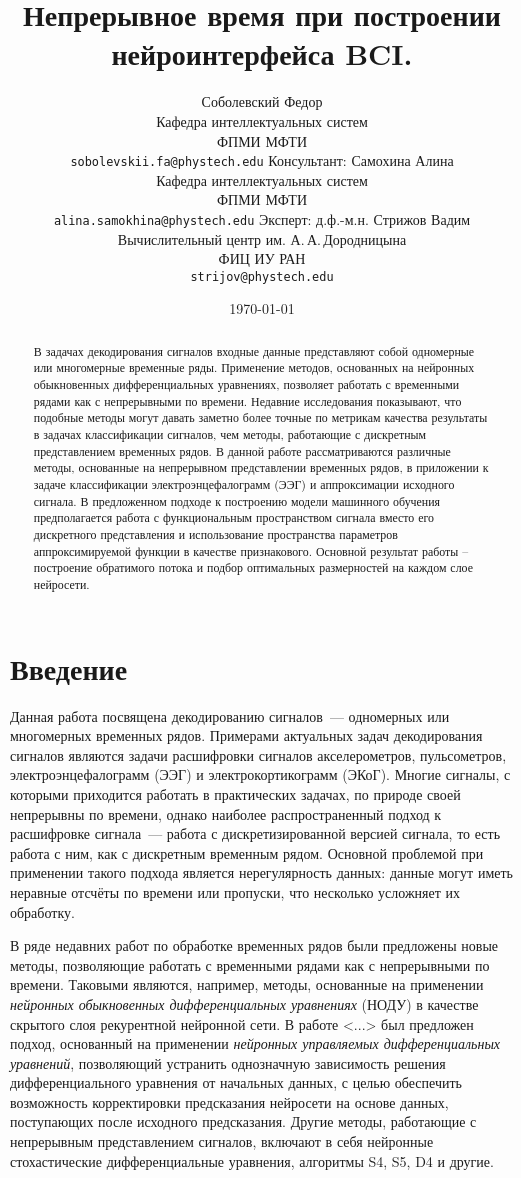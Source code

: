 \documentclass[a4paper, 12pt]{article} %
\title{Непрерывное время при построении нейроинтерфейса BCI.}
\author{ Соболевский Федор\\
	Кафедра интеллектуальных систем \\
        ФПМИ МФТИ\\ 
	\texttt{sobolevskii.fa@phystech.edu} 
	\AND
        Консультант: Самохина Алина\\
	Кафедра интеллектуальных систем \\
        ФПМИ МФТИ\\
	\texttt{alina.samokhina@phystech.edu} 
        \AND
        Эксперт: д.ф.-м.н. Стрижов Вадим\\
	Вычислительный центр им. А.\,А.\,Дородницына\\
        ФИЦ ИУ РАН \\
	\texttt{strijov@phystech.edu}
}
\date{\today}
\begin{document}
\maketitle


\begin{abstract}
В задачах декодирования сигналов входные данные представляют собой одномерные или многомерные временные ряды. Применение методов, основанных на нейронных обыкновенных дифференциальных уравнениях, позволяет работать с временными рядами как с непрерывными по времени. Недавние исследования показывают, что подобные методы могут давать заметно более точные по метрикам качества результаты в задачах классификации сигналов, чем методы, работающие с дискретным представлением временных рядов. В данной работе рассматриваются различные методы, основанные на непрерывном представлении временных рядов, в приложении к задаче классификации электроэнцефалограмм (ЭЭГ) и аппроксимации исходного сигнала. В предложенном подходе к построению модели машинного обучения предполагается работа с функциональным пространством сигнала вместо его дискретного представления и использование пространства параметров аппроксимируемой функции в качестве признакового. Основной результат работы – построение обратимого потока и подбор оптимальных размерностей на каждом слое нейросети. 
\end{abstract}




\section{Введение}
Данная работа посвящена декодированию сигналов~--- одномерных или многомерных временных рядов. Примерами актуальных задач декодирования сигналов являются задачи расшифровки сигналов акселерометров, пульсометров, электроэнцефалограмм (ЭЭГ) и электрокортикограмм (ЭКоГ). Многие сигналы, с которыми приходится работать в практических задачах, по природе своей непрерывны по времени, однако наиболее распространенный подход к расшифровке сигнала~--- работа с дискретизированной версией сигнала, то есть работа с ним, как с дискретным временным рядом. Основной проблемой при применении такого подхода является нерегулярность данных: данные могут иметь неравные отсчёты по времени или пропуски, что несколько усложняет их обработку.

В ряде недавних работ по обработке временных рядов были предложены новые методы, позволяющие работать с временными рядами как с непрерывными по времени. Таковыми являются, например, методы, основанные на применении \textit{нейронных обыкновенных дифференциальных уравнениях} (НОДУ) в качестве скрытого слоя рекурентной нейронной сети. В работе <...> был предложен подход, основанный на применении \textit{нейронных управляемых дифференциальных уравнений}, позволяющий устранить однозначную зависимость решения дифференциального уравнения от начальных данных, с целью обеспечить возможность корректировки предсказания нейросети на основе данных, поступающих после исходного предсказания. Другие методы, работающие с непрерывным представлением сигналов, включают в себя нейронные стохастические дифференциальные уравнения, алгоритмы S4, S5, D4 и другие.
\end{document}
